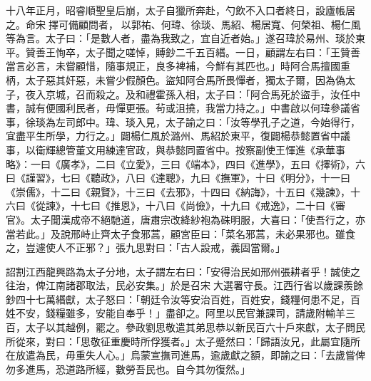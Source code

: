 \begin{pinyinscope}
 十八年正月，昭睿順聖皇后崩，太子自獵所奔赴，勺飲不入口者終日，設廬帳居之。命宋擇可備顧問者，以郭祐、何瑋、徐琰、馬紹、楊居寬、何榮祖、楊仁風等為言。太子曰：「是數人者，盡為我致之，宜自近者始。」遂召瑋於易州、琰於東平。贊善王恂卒，太子聞之嗟悼，賻鈔二千五百緡。一日，顧謂左右曰：「王贊善當言必言，未嘗顧惜，隨事規正，良多裨補，今鮮有其匹也。」時阿合馬擅國重柄，太子惡其奸惡，未嘗少假顏色。盜知阿合馬所畏憚者，獨太子爾，因為偽太子，夜入京城，召而殺之。及和禮霍孫入相，太子曰：「阿合馬死於盜手，汝任中書，誠有便國利民者，毋憚更張。茍或沮撓，我當力持之。」中書啟以何瑋參議省事，徐琰為左司郎中。瑋、琰入見，太子諭之曰：「汝等學孔子之道，今始得行，宜盡平生所學，力行之。」闢楊仁風於潞州、馬紹於東平，復闢楊恭懿置省中議事，以衛輝總管董文用練達官政，與恭懿同置省中。按察副使王惲進《承華事略》：一曰《廣孝》，二曰《立愛》，三曰《端本》，四曰《進學》，五曰《擇術》，六曰《謹習》，七曰《聽政》，八曰《達聰》，九曰《撫軍》，十曰《明分》，十一曰《崇儒》，十二曰《親賢》，十三曰《去邪》，十四曰《納誨》，十五曰《幾諫》，十六曰《從諫》，十七曰《推恩》，十八曰《尚儉》，十九曰《戒逸》，二十曰《審官》。太子聞漢成帝不絕馳道，唐肅宗改絳紗袍為硃明服，大喜曰：「使吾行之，亦當若此。」及說邢峙止齊太子食邪蒿，顧宮臣曰：「菜名邪蒿，未必果邪也。雖食之，豈遽使人不正邪？」張九思對曰：「古人設戒，義固當爾。」



 詔割江西龍興路為太子分地，太子謂左右曰：「安得治民如邢州張耕者乎！誠使之往治，俾江南諸郡取法，民必安集。」於是召宋大選署守長。江西行省以歲課羨餘鈔四十七萬緡獻，太子怒曰：「朝廷令汝等安治百姓，百姓安，錢糧何患不足，百姓不安，錢糧雖多，安能自奉乎！」盡卻之。阿里以民官兼課司，請歲附輸羊三百，太子以其越例，罷之。參政劉思敬遣其弟思恭以新民百六十戶來獻，太子問民所從來，對曰：「思敬征重慶時所俘獲者。」太子蹙然曰：「歸語汝兄，此屬宜隨所在放遣為民，毋重失人心。」烏蒙宣撫司進馬，逾歲獻之額，即諭之曰：「去歲嘗俾勿多進馬，恐道路所經，數勞吾民也。自今其勿復然。」




\end{pinyinscope}
